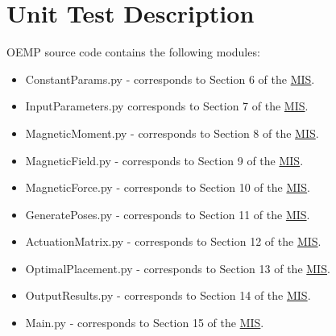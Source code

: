 \documentclass[12pt, titlepage]{article}
\begin{document}
\section{Unit Test Description} \label{unit_tests}
OEMP source code contains the following modules:
\begin{itemize}
  \item ConstantParams.py - corresponds to Section 6 of the \href{https://github.com/husseinsd1/optimal-em-arrangement/blob/main/docs/Design/SoftDetailedDes/MIS.pdf}{MIS}.
  \item InputParameters.py corresponds to Section 7 of the \href{https://github.com/husseinsd1/optimal-em-arrangement/blob/main/docs/Design/SoftDetailedDes/MIS.pdf}{MIS}.
  \item MagneticMoment.py - corresponds to Section 8 of the \href{https://github.com/husseinsd1/optimal-em-arrangement/blob/main/docs/Design/SoftDetailedDes/MIS.pdf}{MIS}.
  \item MagneticField.py - corresponds to Section 9 of the \href{https://github.com/husseinsd1/optimal-em-arrangement/blob/main/docs/Design/SoftDetailedDes/MIS.pdf}{MIS}.
  \item MagneticForce.py - corresponds to Section 10 of the \href{https://github.com/husseinsd1/optimal-em-arrangement/blob/main/docs/Design/SoftDetailedDes/MIS.pdf}{MIS}.
  \item GeneratePoses.py - corresponds to Section 11 of the \href{https://github.com/husseinsd1/optimal-em-arrangement/blob/main/docs/Design/SoftDetailedDes/MIS.pdf}{MIS}.
  \item ActuationMatrix.py - corresponds to Section 12 of the \href{https://github.com/husseinsd1/optimal-em-arrangement/blob/main/docs/Design/SoftDetailedDes/MIS.pdf}{MIS}.
  \item OptimalPlacement.py - corresponds to Section 13 of the \href{https://github.com/husseinsd1/optimal-em-arrangement/blob/main/docs/Design/SoftDetailedDes/MIS.pdf}{MIS}.
  \item OutputResults.py - corresponds to Section 14 of the \href{https://github.com/husseinsd1/optimal-em-arrangement/blob/main/docs/Design/SoftDetailedDes/MIS.pdf}{MIS}.
  \item Main.py - corresponds to Section 15 of the \href{https://github.com/husseinsd1/optimal-em-arrangement/blob/main/docs/Design/SoftDetailedDes/MIS.pdf}{MIS}.
\end{itemize}
\end{document}
